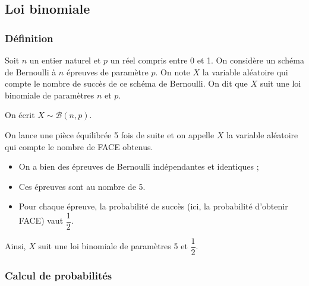 \documentclass[11pt,fleqn, openany]{book} %
\begin{document}
\subsection{Loi binomiale}

\subsubsection{Définition}

\begin{definition}Soit $n$ un entier naturel et $p$ un réel compris entre 0 et 1. On considère un schéma de Bernoulli à $n$ épreuves de paramètre $p$. On note $X$ la variable aléatoire qui compte le nombre de succès de ce schéma de Bernoulli. On dit que $X$ suit une loi binomiale de paramètres $n$ et $p$.

 On écrit $X\sim \mathcal{B}(n,p)$.\end{definition}

\begin{example}On lance une pièce équilibrée 5 fois de suite et on appelle $X$ la variable aléatoire qui compte le nombre de FACE obtenus.
\begin{itemize}
\item On a bien des épreuves de Bernoulli indépendantes et identiques ;
\item Ces épreuves sont au nombre de 5.
\item Pour chaque épreuve, la probabilité de succès (ici, la probabilité d'obtenir FACE) vaut $\dfrac{1}{2}$.
\end{itemize}
Ainsi, $X$ suit une loi binomiale de paramètres 5 et $\dfrac{1}{2}$.\end{example}

\subsubsection{Calcul de probabilités}
\end{document}
